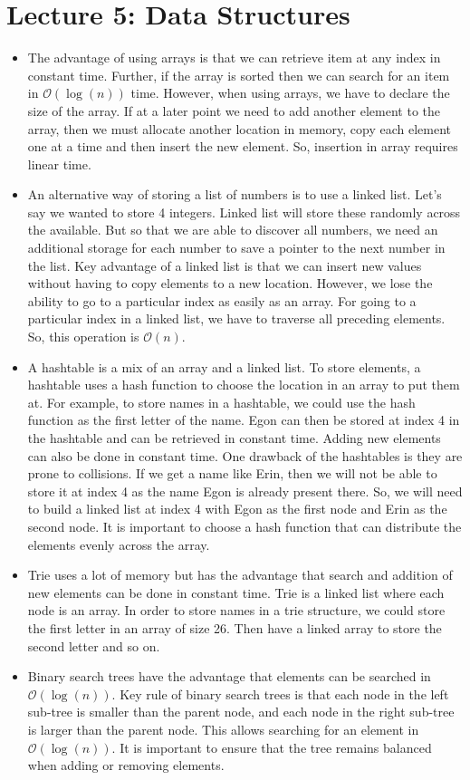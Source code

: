 \documentclass[11pt]{article}
\begin{document}
\section*{Lecture 5: Data Structures}
\begin{itemize}
	\item The advantage of using arrays is that we can retrieve item at any index in constant time. Further, if the array is sorted then we can search for an item in $\mathcal{O}(\log(n))$ time. However, when using arrays, we have to declare the size of the array. If at a later point we need to add another element to the array, then we must allocate another location in memory, copy each element one at a time and then insert the new element. So, insertion in array requires linear time.
	\item An alternative way of storing a list of numbers is to use a linked list. Let's say we wanted to store 4 integers. Linked list will store these randomly across the available. But so that we are able to discover all numbers, we need an additional storage for each number to save a pointer to the next number in the list. Key advantage of a linked list is that we can insert new values without having to copy elements to a new location. However, we lose the ability to go to a particular index as easily as an array. For going to a particular index in a linked list, we have to traverse all preceding elements. So, this operation is $\mathcal{O}(n)$. 
	\item A hashtable is a mix of an array and a linked list. To store elements, a hashtable uses a hash function to choose the location in an array to put them at. For example, to store names in a hashtable, we could use the hash function as the first letter of the name. Egon can then be stored at index 4 in the hashtable and can be retrieved in constant time. Adding new elements can also be done in constant time. One drawback of the hashtables is they are prone to collisions. If we get a name like Erin, then we will not be able to store it at index 4 as the name Egon is already present there. So, we will need to build a linked list at index 4 with Egon as the first node and Erin as the second node. It is important to choose a hash function that can distribute the elements evenly across the array. 
	\item Trie uses a lot of memory but has the advantage that search and addition of new elements can be done in constant time. Trie is a linked list where each node is an array. In order to store names in a trie structure, we could store the first letter in an array of size 26. Then have a linked array to store the second letter and so on. 
	\item Binary search trees have the advantage that elements can be searched in $\mathcal{O}(\log(n))$. Key rule of binary search trees is that each node in the left sub-tree is smaller than the parent node, and each node in the right sub-tree is larger than the parent node. This allows searching for an element in $\mathcal{O}(\log(n))$. It is important to ensure that the tree remains balanced when adding or removing elements. 
\end{itemize}
\end{document}
